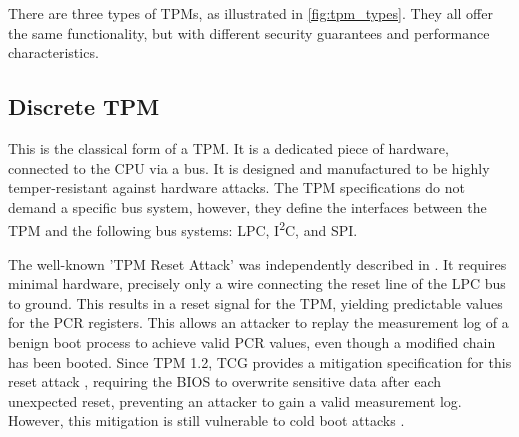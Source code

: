 


There are three types of TPMs, as illustrated in \autoref{fig:tpm_types}. They all offer the same functionality, but with different security guarantees and performance characteristics.



\subsection{Discrete TPM}

This is the classical form of a TPM. It is a dedicated piece of hardware, connected to the CPU via a bus. It is designed and manufactured to be highly temper-resistant against hardware attacks.
The TPM specifications \cite{tpm, tcgPcClient} do not demand a specific bus system, however, they define the interfaces between the TPM and the following bus systems: LPC, I\textsuperscript{2}C, and SPI.

The well-known 'TPM Reset Attack' was independently described in \cite{kauerBernhard,sparks2007}. It requires minimal hardware, precisely only a wire connecting the reset line of the LPC bus \cite{lpc} to ground. This results in a reset signal for the TPM, yielding predictable values for the \ac{PCR} registers. This allows an attacker to replay the measurement log of a benign boot process to achieve valid \ac{PCR} values, even though a modified chain has been booted.
Since TPM 1.2, TCG provides a mitigation specification for this reset attack \cite{tcgResetFix}, requiring the BIOS to overwrite sensitive data after each unexpected reset, preventing an attacker to gain a valid measurement log.
However, this mitigation is still vulnerable to cold boot attacks \cite{Halderman2009, Winter2013}.

